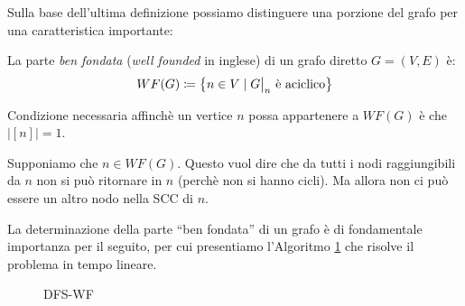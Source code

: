 Sulla base dell'ultima definizione possiamo distinguere una porzione del grafo per una caratteristica importante:
\begin{definition}
    La parte \emph{ben fondata} (\emph{well founded} in inglese) di un grafo diretto $G = (V,E)$ è:
    \begin{gather*}
        WF(G) \coloneqq \left\{n \in V \mid \restr{G}{n} \text{ è aciclico}\right\}
    \end{gather*}
\end{definition}
\begin{observation}
    Condizione necessaria affinchè un vertice $n$ possa appartenere a $WF(G)$ è che $|[n]| = 1$.
\end{observation}
\begin{proof2}
    Supponiamo che $n \in WF(G)$. Questo vuol dire che da tutti i nodi raggiungibili da $n$ non si può ritornare in $n$ (perchè non si hanno cicli). Ma allora non ci può essere un altro nodo nella SCC di $n$.
\end{proof2}
La determinazione della parte ``ben fondata'' di un grafo è di fondamentale importanza per il seguito, per cui presentiamo l'Algoritmo \ref{alg:dfs-wf} che risolve il problema in tempo lineare.
\begin{figure}[H]
    \begin{algorithm}[H]
        \label{alg:dfs-wf}
        \caption{DFS-WF}
        \SetAlgoLined
    \end{algorithm}
\end{figure}

